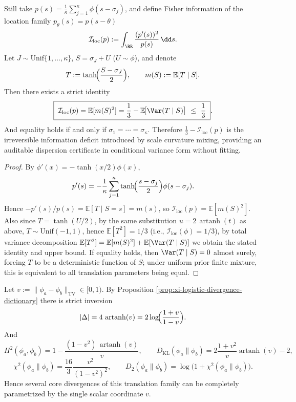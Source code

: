 \begin{proposition}\label{prop:xi-logistic-fisher-information-deficit}
Still take
\(
p(s)=\frac{1}{\kappa}\sum_{j=1}^{\kappa}\phi(s-\sigma_j)
\), and define Fisher information of the location family \(p_\theta(s)=p(s-\theta)\)
\[
\mathcal I_{\mathrm{loc}}(p):=\int_{\RR}\frac{(p'(s))^{2}}{p(s)}\,\dd s.
\]
Let \(J\sim\mathrm{Unif}\{1,\dots,\kappa\}\), \(S=\sigma_J+U\) (\(U\sim\phi\)), and denote
\[
T:=\tanh\!\Bigl(\frac{S-\sigma_J}{2}\Bigr),
\qquad
m(S):=\mathbb E[T\mid S].
\]
Then there exists a strict identity
\[
\boxed{\;
\mathcal I_{\mathrm{loc}}(p)=\mathbb E[m(S)^{2}]
=\frac{1}{3}-\mathbb E\!\bigl[\Var(T\mid S)\bigr]
\ \le\ \frac{1}{3}\; }.
\]
And equality holds if and only if \(\sigma_1=\cdots=\sigma_\kappa\).
Therefore \( \frac{1}{3}-\mathcal I_{\mathrm{loc}}(p)\) is the irreversible information deficit introduced by scale curvature mixing, providing an auditable dispersion certificate in conditional variance form without fitting.
\end{proposition}
\begin{proof}
By \(\phi'(x)=-\tanh(x/2)\phi(x)\),
\[
p'(s)=-\frac{1}{\kappa}\sum_{j=1}^{\kappa}\tanh\!\Bigl(\frac{s-\sigma_j}{2}\Bigr)\phi(s-\sigma_j).
\]
Hence
\(
-p'(s)/p(s)=\mathbb E[T\mid S=s]=m(s)
\), so
\(
\mathcal I_{\mathrm{loc}}(p)=\mathbb E[m(S)^{2}]
\).
Also since \(T=\tanh(U/2)\), by the same substitution \(u=2\,\operatorname{artanh}(t)\) as above, \(T\sim\mathrm{Unif}(-1,1)\), hence \(\mathbb E[T^{2}]=1/3\) (i.e., \(\mathcal I_{\mathrm{loc}}(\phi)=1/3\)),
by total variance decomposition
\(
\mathbb E[T^{2}]=\mathbb E[m(S)^{2}]+\mathbb E[\Var(T\mid S)]
\)
we obtain the stated identity and upper bound.
If equality holds, then \(\Var(T\mid S)=0\) almost surely, forcing \(T\) to be a deterministic function of \(S\);
under uniform prior finite mixture, this is equivalent to all translation parameters being equal.
\end{proof}

\begin{remark}\label{rem:xi-logistic-tv-coordinate-parametrization}
Let \(v:=\|\phi_a-\phi_b\|_{\mathrm{TV}}\in[0,1)\).
By Proposition \ref{prop:xi-logistic-divergence-dictionary} there is strict inversion
\[
|\Delta|=4\,\operatorname{artanh}(v)=2\log\!\Bigl(\frac{1+v}{1-v}\Bigr).
\]
And
\[
H^{2}(\phi_a,\phi_b)
=1-\frac{(1-v^{2})\,\operatorname{artanh}(v)}{v},
\qquad
D_{\mathrm{KL}}(\phi_a\|\phi_b)
=2\frac{1+v^{2}}{v}\operatorname{artanh}(v)-2,
\]
\[
\chi^{2}(\phi_a\|\phi_b)
=\frac{16}{3}\frac{v^{2}}{(1-v^{2})^{2}},
\qquad
D_{2}(\phi_a\|\phi_b)
=\log\!\bigl(1+\chi^{2}(\phi_a\|\phi_b)\bigr).
\]
Hence several core divergences of this translation family can be completely parametrized by the single scalar coordinate \(v\).
\end{remark}

